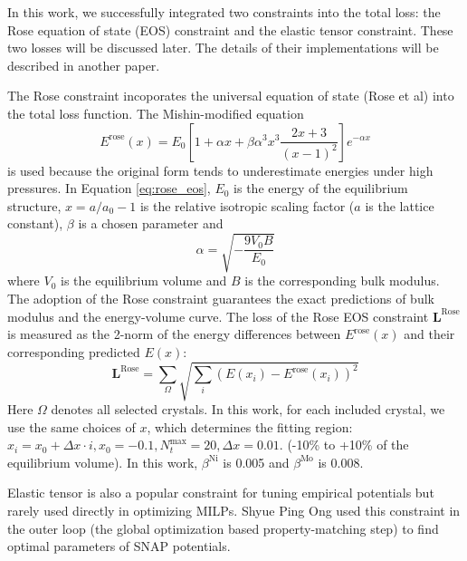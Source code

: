 \documentclass[prb,reprint,superscriptaddress]{revtex4-2}
\begin{document}
In this work, we successfully integrated two constraints into the total loss:
the Rose equation of state (EOS) \cite{Rose0,Rose1,Rose2} constraint and the 
elastic tensor constraint. These two losses will be discussed later. The details 
of their implementations will be described in another paper.

The Rose constraint incoporates the universal equation of state (Rose et al) 
into the total loss function. The Mishin-modified equation 
\begin{equation}
\label{eq:rose_eos}
E^\mathrm{rose}(x) = E_{0}\left[
    1 + \alpha x + \beta \alpha^3 x^3 \frac{2x + 3}{(x - 1)^2} \right]
    e^{-\alpha x}
\end{equation}
is used because the original form tends to underestimate energies under high 
pressures. In Equation \ref{eq:rose_eos}, $E_{0}$ is the energy of the 
equilibrium structure, $x = a / a_{0} - 1$ is the relative isotropic scaling 
factor ($a$ is the lattice constant), $\beta$ is a chosen parameter and 
\begin{equation}
\label{eq:rose_alpha}
\alpha = \sqrt{-\frac{9 V_{0} B }{E_{0}}}
\end{equation}
where $V_0$ is the equilibrium volume and $B$ is the corresponding bulk modulus. 
The adoption of the Rose constraint guarantees the exact predictions of bulk 
modulus and the energy-volume curve. The loss of the Rose EOS constraint 
$\mathbf{L}^{\mathrm{Rose}}$  is measured as the 2-norm of the energy 
differences between $E^{\mathrm{rose}}(x)$ and their corresponding predicted 
$E(x)$: 
\begin{equation}
\label{eq:rose_loss}
\mathbf{L}^{\mathrm{Rose}} = \sum_{\Omega}{
    \sqrt{\sum_{i}{\left(E(x_i) - E^{\mathrm{rose}}(x_i)\right)^2}}
}
\end{equation}
Here $\Omega$ denotes all selected crystals. In this work, for each included 
crystal, we use the same choices of $x$, which determines the fitting region: 
$x_{i} = x_{0} + \Delta x \cdot i, x_{0} = -0.1, N_{t}^{\mathrm{max}} = 20, 
\Delta x=0.01$. (-10\% to +10\% of the equilibrium volume). In this work, 
$\beta^{\mathrm{Ni}}$ is 0.005 and $\beta^{\mathrm{Mo}}$ is 0.008.
 
Elastic tensor is also a popular constraint for tuning empirical potentials but 
rarely used directly in optimizing MILPs. Shyue Ping Ong used this constraint in 
the outer loop (the global optimization based property-matching step) to find 
optimal parameters of SNAP potentials. 
\end{document}
